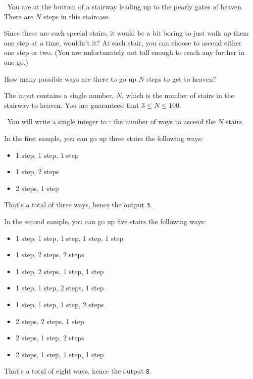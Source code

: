 

\Question\ You are at the bottom of a stairway leading up to the pearly gates of heaven.
There are $N$ steps in this staircase.

Since these are such special stairs, it would be a bit boring to just walk up them one
step at a time, wouldn't it? At each stair, you can choose to ascend either one step or
two. (You are unfortunately not tall enough to reach any further in one go.)

How many possible ways are there to go up $N$ steps to get to heaven?

\Input The input contains a single number, $N$, which is the number of stairs in the
stairway to heaven. You are guaranteed that $3 \le N \le 100$.

\Output\ You will write a single integer to \OUT: the number of ways to ascend the $N$
stairs.

\Sample
{}

\Explanation In the first sample, you can go up three stairs the following ways:
\begin{itemize}
  \item 1 step, 1 step, 1 step
  \item 1 step, 2 steps
  \item 2 steps, 1 step
\end{itemize}
That's a total of three ways, hence the output \texttt{3}.

In the second sample, you can go up five stairs the following ways:
\begin{itemize}
  \item 1 step, 1 step, 1 step, 1 step, 1 step
  \item 1 step, 2 steps, 2 steps
  \item 1 step, 2 steps, 1 step, 1 step
  \item 1 step, 1 step, 2 steps, 1 step
  \item 1 step, 1 step, 1 step, 2 steps
  \item 2 steps, 2 steps, 1 step
  \item 2 steps, 1 step, 2 steps
  \item 2 steps, 1 step, 1 step, 1 step
\end{itemize}
That's a total of eight ways, hence the output \texttt{8}.

